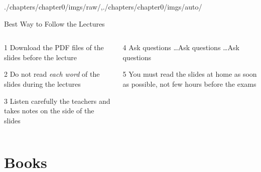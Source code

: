 \begin{graphicspathcontext}{{./chapters/chapter0/imgs/raw/},{./chapters/chapter0/imgs/auto/}}
\begin{frame}{{Best Way} to Follow the Lectures}
	\begin{columns}
		\begin{column}{.5\linewidth}
			\begin{rightanchorblock}{}{1}
				Download the PDF files of the slides before the lecture
			\end{rightanchorblock}
			\begin{rightanchorblock}{}{2}
				Do not read \emph{each word} of the slides during the lectures
			\end{rightanchorblock}
			\begin{rightanchorblock}{}{3}
				Listen carefully the teachers and takes notes on the side of the slides
			\end{rightanchorblock}
		\end{column}
		\begin{column}{.5\linewidth}
			\begin{leftanchorblock}{}{4}
				Ask questions \dots Ask questions \dots Ask questions
			\end{leftanchorblock}
			\vspace{.5cm}
			\begin{leftanchorblock}{}{5}
				You must read the slides at home as soon as possible, not few hours before the exams
			\end{leftanchorblock}
		\end{column}
	\end{columns}
\end{frame}

\section{Books}




\end{graphicspathcontext}
